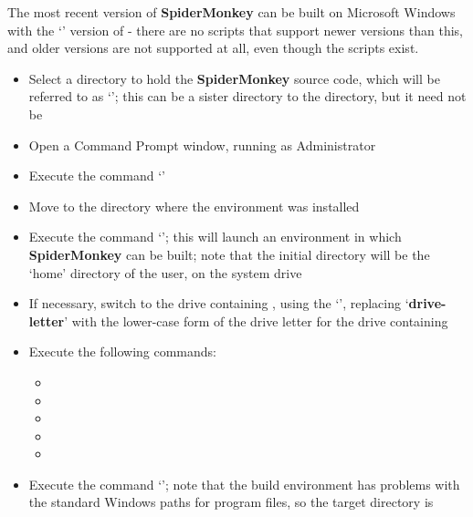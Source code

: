 \tertiaryEnd
{}
The most recent version of \textbf{SpiderMonkey} can be built on Microsoft Windows with
the `' version of  - there are
no scripts that support newer versions than this, and older versions are not supported at
all, even though the scripts exist.
\begin{itemize}
\item Select a directory to hold the \textbf{SpiderMonkey} source code, which will be
referred to as `'; this can be a sister directory to the
 directory, but it need not be
\item\exSp{} Open a Command Prompt window, running as Administrator
\item\exSp{} Execute the command
`'
\item\exSp{} Move to the directory where the  environment was
installed
\item\exSp{} Execute the command `'; this will launch
an environment in which \textbf{SpiderMonkey} can be built; note that the initial
directory will be the `home' directory of the user, on the system drive
\item\exSp{} If necessary, switch to the drive containing ,
using the `', replacing `\textbf{drive-letter}' with
the lower-case form of the drive letter for the drive containing
\item\exSp{} Execute the following commands:
\begin{itemize}
\item{}
\item\exSp{}
\item\exSp{}
\item\exSp{}
\item\exSp{}
\end{itemize}
\item\exSp{} Execute the command `'; note that the build environment
has problems with the standard Windows paths for program files, so the target directory is

\end{itemize}
